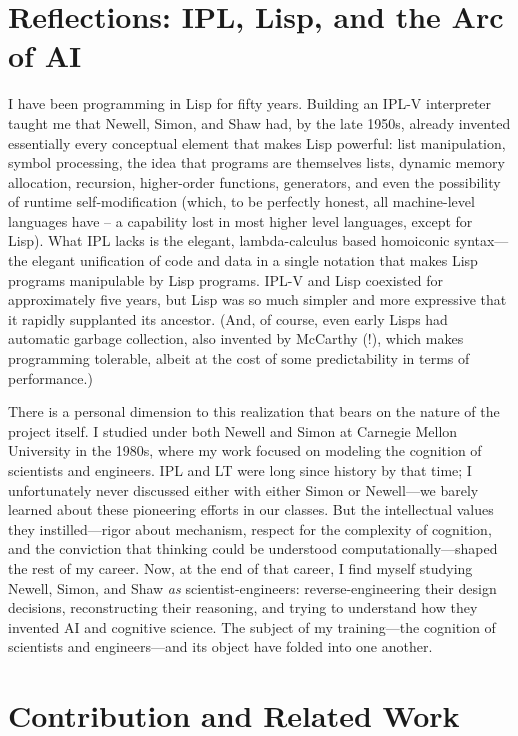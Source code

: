 \documentclass[journal]{IEEEtran}
\begin{document}
\section{Reflections: IPL, Lisp, and the Arc of AI}
\label{sec:reflections}

I have been programming in Lisp for fifty years. Building an IPL-V
interpreter taught me that Newell, Simon, and Shaw had, by the late
1950s, already invented essentially every conceptual element that
makes Lisp powerful: list manipulation, symbol processing, the idea
that programs are themselves lists, dynamic memory allocation,
recursion, higher-order functions, generators, and even the
possibility of runtime self-modification (which, to be perfectly
honest, all machine-level languages have -- a capability lost in most
higher level languages, except for Lisp). What IPL lacks is the
elegant, lambda-calculus based homoiconic syntax---the elegant
unification of code and data in a single notation that makes Lisp
programs manipulable by Lisp programs.  IPL-V and Lisp coexisted for
approximately five years, but Lisp was so much simpler and more
expressive that it rapidly supplanted its ancestor. (And, of course,
even early Lisps had automatic garbage collection, also invented by
McCarthy (!), which makes programming tolerable, albeit at the cost
of some predictability in terms of performance.)

There is a personal dimension to this realization that bears on the
nature of the project itself. I studied under both Newell and Simon at
Carnegie Mellon University in the 1980s, where my work focused on
modeling the cognition of scientists and engineers. IPL and LT were
long since history by that time; I unfortunately never discussed
either with either Simon or Newell---we barely learned about these
pioneering efforts in our classes. But the intellectual values they
instilled---rigor about mechanism, respect for the complexity of
cognition, and the conviction that thinking could be understood
computationally---shaped the rest of my career. Now, at the end of
that career, I find myself studying Newell, Simon, and Shaw
\textit{as} scientist-engineers: reverse-engineering their design
decisions, reconstructing their reasoning, and trying to understand
how they invented AI and cognitive science. The subject of my
training---the cognition of scientists and engineers---and its object
have folded into one another.

\section{Contribution and Related Work}
\label{sec:related}
\end{document}
